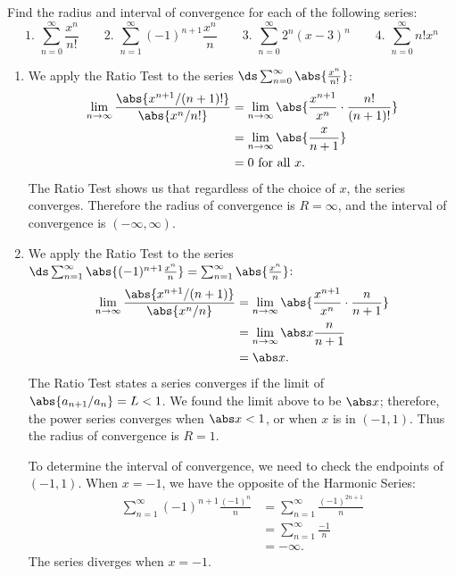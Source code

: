 \begin{example}\label{ex_ps2}
Find the radius and interval of convergence for each of the following series:
\[
 \text{1. }\sum_{n=0}^\infty \frac{x^n}{n!} \qquad
 \text{2. }\sum_{n=1}^\infty (-1)^{n+1}\frac{x^n}{n}\qquad
 \text{3. }\sum_{n=0}^\infty 2^n(x-3)^n\qquad
 \text{4. }\sum_{n=0}^\infty n!x^n
\]
\solution
\begin{enumerate}
	\item We apply the Ratio Test to the series $\ds \sum_{n=0}^\infty \abs{\frac{x^n}{n!}}$:
		\begin{align*}
		\lim_{n\to\infty} \frac{\abs{x^{n+1}/(n+1)!}}{\abs{x^n/n!}} &= \lim_{n\to\infty} \abs{\frac{x^{n+1}}{x^n}\cdot\frac{n!}{(n+1)!}}\\
			&= \lim_{n\to\infty} \abs{\frac x{n+1}}\\
			&= 0 \text{ for all } x.
		\end{align*}
		The Ratio Test shows us that regardless of the choice of $x$, the series converges. Therefore the radius of convergence is $R=\infty$, and the interval of convergence is $(-\infty,\infty)$.
		
	\item		We apply the Ratio Test to the series $\ds \sum_{n=1}^\infty \abs{(-1)^{n+1}\frac{x^n}{n}} = \sum_{n=1}^\infty \abs{\frac{x^n}{n}}$:
	\begin{align*}
	\lim_{n\to\infty} \frac{\abs{x^{n+1}/(n+1)}}{\abs{x^n/n}} &= \lim_{n\to\infty} \abs{\frac{x^{n+1}}{x^n}\cdot \frac{n}{n+1}} \\
			&= \lim_{n\to\infty} \abs x\frac{n}{n+1}\\
			&= \abs x.
	\end{align*}
	The Ratio Test states a series converges if the limit of $\abs{a_{n+1}/a_n} = L<1$. We found the limit above to be $\abs x$; therefore, the power series converges when $\abs x<1$, or when $x$ is in $(-1,1)$. Thus the radius of convergence is $R=1$.
	
	To determine the interval of convergence, we need to check the endpoints of $(-1,1)$. When $x=-1$, we have the opposite of the Harmonic Series:
	\begin{align*}
	\sum_{n=1}^\infty (-1)^{n+1}\frac{(-1)^n}{n}
	&= \sum_{n=1}^\infty \frac{(-1)^{2n+1}}{n}\\
	&= \sum_{n=1}^\infty \frac{-1}{n}\\
	&= -\infty.
	\end{align*}
	The series diverges when $x=-1$.
	

\end{enumerate}
\end{example}
